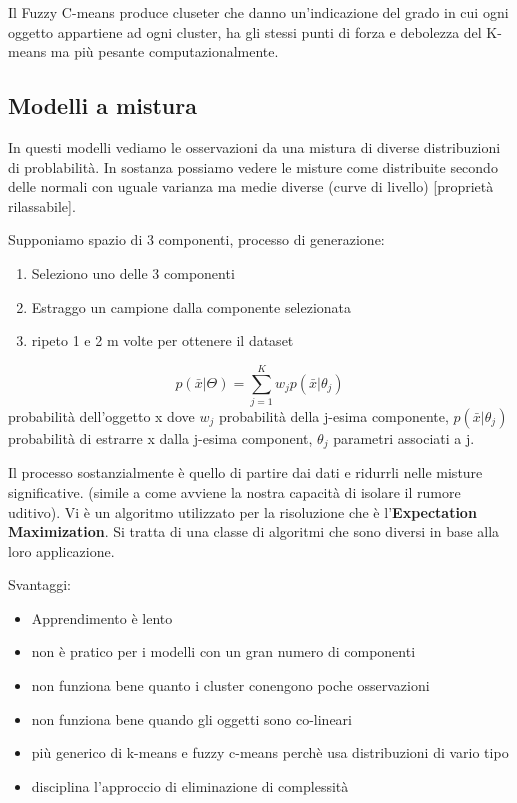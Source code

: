 Il Fuzzy C-means produce cluseter che danno un'indicazione del grado in cui ogni oggetto appartiene ad ogni cluster, ha gli stessi punti di forza e debolezza del K-means ma pi\`u pesante computazionalmente.

\subsection{Modelli a mistura}
In questi modelli vediamo le osservazioni da una mistura di diverse distribuzioni di problabilit\`a. In sostanza possiamo vedere le misture come distribuite secondo delle normali con uguale varianza ma medie diverse (curve di livello) [propriet\`a rilassabile]. 

Supponiamo spazio di 3 componenti, processo di generazione:
\begin{enumerate}
	\item Seleziono uno delle 3 componenti
	\item Estraggo un campione dalla componente selezionata
	\item ripeto 1 e 2 m volte per ottenere il dataset
\end{enumerate} 

\[ p(\bar{x}|\Theta) = \sum_{j=1}^{K} w_j p(\bar{x}|\theta_j)\] probabilit\`a dell'oggetto x dove $w_j$ probabilit\`a della j-esima componente, $p(\bar{x}|\theta_j)$ probabilit\`a di estrarre x dalla j-esima component, $\theta_j$ parametri associati a j.

Il processo sostanzialmente \`e quello di partire dai dati e ridurrli nelle misture significative. (simile a come avviene la nostra capacit\`a di isolare il rumore uditivo). Vi \`e un algoritmo utilizzato per la risoluzione che \`e l'\textbf{Expectation Maximization}. Si tratta di una classe di algoritmi che sono diversi in base alla loro applicazione. 

Svantaggi:
\begin{itemize}
	\item Apprendimento \`e lento
	\item non \`e pratico per i modelli con un gran numero di componenti
	\item non funziona bene quanto i cluster conengono  poche osservazioni
	\item non funziona bene quando gli oggetti sono co-lineari
\end{itemize}

\begin{itemize}
	\item pi\`u generico di k-means e fuzzy c-means perch\`e usa distribuzioni di vario tipo
	\item disciplina l'approccio di eliminazione di complessit\`a
\end{itemize}


